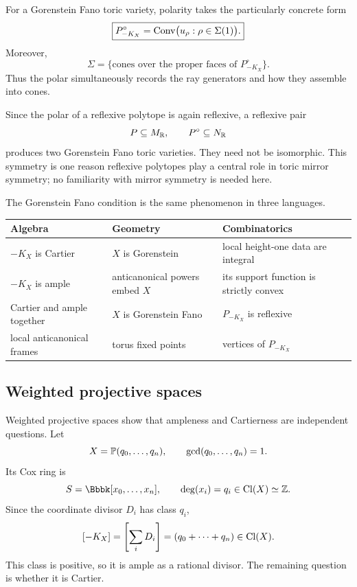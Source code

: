 For a Gorenstein Fano toric variety, polarity takes the particularly
concrete form
\[
\boxed{
P_{-K_X}^\circ
=
\operatorname{Conv}\bigl(u_\rho:\rho\in\Sigma(1)\bigr).
}
\]
Moreover,
\[
\Sigma
=
\{\text{cones over the proper faces of }P_{-K_X}^\circ\}.
\]
Thus the polar simultaneously records the ray generators and how they
assemble into cones.

\begin{observation}
Since the polar of a reflexive polytope is again reflexive, a reflexive
pair
\[
P\subseteq M_{\mathbb{R}},
\qquad
P^\circ\subseteq N_{\mathbb{R}}
\]
produces two Gorenstein Fano toric varieties. They need not be
isomorphic. This symmetry is one reason reflexive polytopes play a
central role in toric mirror symmetry; no familiarity with mirror
symmetry is needed here.
\end{observation}

\begin{threedictionaries}
The Gorenstein Fano condition is the same phenomenon in three
languages.

\medskip

\begin{center}
\small
\begin{tabularx}{\linewidth}{@{}
  >{\raggedright\arraybackslash}X
  >{\raggedright\arraybackslash}X
  >{\raggedright\arraybackslash}X@{}}
\toprule
\textbf{Algebra}
&
\textbf{Geometry}
&
\textbf{Combinatorics}
\\
\midrule
\(-K_X\) is Cartier
&
\(X\) is Gorenstein
&
local height-one data are integral
\\
\(-K_X\) is ample
&
anticanonical powers embed \(X\)
&
its support function is strictly convex
\\
Cartier and ample together
&
\(X\) is Gorenstein Fano
&
\(P_{-K_X}\) is reflexive
\\
local anticanonical frames
&
torus fixed points
&
vertices of \(P_{-K_X}\)
\\
\bottomrule
\end{tabularx}
\end{center}
\end{threedictionaries}

\subsection{Weighted projective spaces}

Weighted projective spaces show that ampleness and Cartierness are
independent questions. Let
\[
X=\mathbb{P}(q_0,\dots,q_n),
\qquad
\gcd(q_0,\dots,q_n)=1.
\]
Its Cox ring is
\[
S=\Bbbk[x_0,\dots,x_n],
\qquad
\deg(x_i)=q_i\in\Cl(X)\simeq\ZZ.
\]
Since the coordinate divisor \(D_i\) has class \(q_i\),
\[
[-K_X]
=
\left[\sum_iD_i\right]
=
(q_0+\cdots+q_n)\in\operatorname{Cl}(X).
\]
This class is positive, so it is ample as a rational divisor. The
remaining question is whether it is Cartier.

